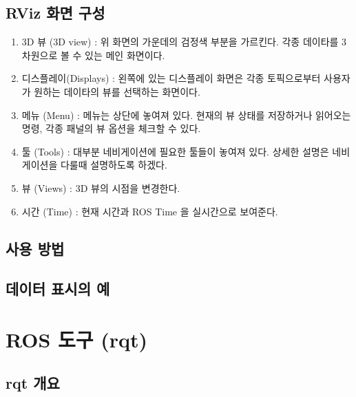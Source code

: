 \subsection{RViz 화면 구성}

\begin{enumerate}[leftmargin=*, label=\arabic{*})]
\item 3D 뷰 (3D view)
: 위 화면의 가운데의 검정색 부분을 가르킨다. 각종 데이타를 3차원으로 볼 수 있는 메인 화면이다.

\item 디스플레이(Displays) 
: 왼쪽에 있는 디스플레이 화면은 각종 토픽으로부터 사용자가 원하는 데이타의 뷰를 선택하는 화면이다.

\item 메뉴 (Menu)
: 메뉴는 상단에 놓여져 있다. 현재의 뷰 상태를 저장하거나 읽어오는 명령, 각종 패널의 뷰 옵션을 체크할 수 있다.

\item 툴 (Tools)
: 대부분 네비게이션에 필요한 툴들이 놓여져 있다. 상세한 설명은 네비게이션을 다룰때 설명하도록 하겠다.

\item 뷰 (Views)
: 3D 뷰의 시점을 변경한다.

\item 시간 (Time)
: 현재 시간과 ROS Time 을 실시간으로 보여준다.
\end{enumerate}

\subsection{사용 방법}

\subsection{데이터 표시의 예}

\section{ROS 도구 (rqt) }

\subsection{rqt 개요}


